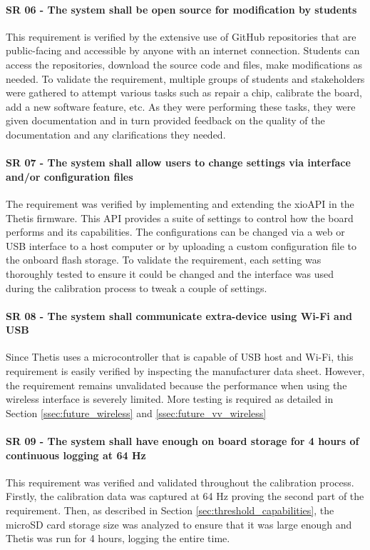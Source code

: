 \paragraph*{SR 06 - The system shall be open source for modification by students} This requirement is verified by the extensive use of GitHub repositories that are public-facing and accessible by anyone with an internet connection.
Students can access the repositories, download the source code and files, make modifications as needed.
To validate the requirement, multiple groups of students and stakeholders were gathered to attempt various tasks such as repair a chip, calibrate the board, add a new software feature, etc.
As they were performing these tasks, they were given documentation and in turn provided feedback on the quality of the documentation and any clarifications they needed.

\paragraph*{SR 07 - The system shall allow users to change settings via interface and/or configuration files} The requirement was verified by implementing and extending the xioAPI in the Thetis firmware.
This API provides a suite of settings to control how the board performs and its capabilities.
The configurations can be changed via a web or USB interface to a host computer or by uploading a custom configuration file to the onboard flash storage.
To validate the requirement, each setting was thoroughly tested to ensure it could be changed and the interface was used during the calibration process to tweak a couple of settings.

\paragraph*{SR 08 - The system shall communicate extra-device using Wi-Fi and USB} Since Thetis uses a microcontroller that is capable of USB host and Wi-Fi, this requirement is easily verified by inspecting the manufacturer data sheet.
However, the requirement remains unvalidated because the performance when using the wireless interface is severely limited.
More testing is required as detailed in Section \ref{ssec:future_wireless} and \ref{ssec:future_vv_wireless}

\paragraph*{SR 09 - The system shall have enough on board storage for 4 hours of continuous logging at 64 Hz} This requirement was verified and validated throughout the calibration process.
Firstly, the calibration data was captured at 64 Hz proving the second part of the requirement.
Then, as described in Section \ref{sec:threshold_capabilities}, the microSD card storage size was analyzed to ensure that it was large enough and Thetis was run for 4 hours, logging the entire time.